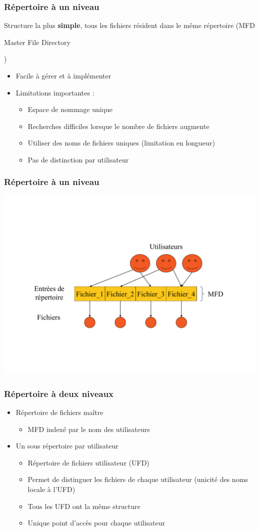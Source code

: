 \begin{frame}
\frametitle{Répertoire à un niveau}
Structure la plus \textbf{simple}, tous les fichiers résident dans le même répertoire (MFD \begin{tiny}Master File Directory\end{tiny})
\begin{itemize}
\item Facile à gérer et à implémenter
\item Limitations importantes :
\begin{itemize}
\item Espace de nommage unique
\item Recherches difficiles lorsque le nombre de fichiers augmente
\item Utiliser des noms de fichiers uniques (limitation en longueur)
\item Pas de distinction par utilisateur
\end{itemize}
\end{itemize}
\end{frame}

\begin{frame}
\frametitle{Répertoire à un niveau}
\includegraphics[width=.9\textwidth]{../illustration/repertoire_1niveau.pdf}
\end{frame}

\begin{frame}
\frametitle{Répertoire à deux niveaux}
\begin{itemize}
\item Répertoire de fichiers maître
\begin{itemize}
\item MFD indexé par le nom des utilisateurs
\end{itemize}
\item Un sous répertoire par utilisateur
\begin{itemize}
\item Répertoire de fichiers utilisateur (UFD)
\item Permet de distinguer les fichiers de chaque utilisateur (unicité des noms locale à l'UFD)
\item Tous les UFD ont la même structure
\item Unique point d'accès pour chaque utilisateur
\end{itemize}
\end{itemize}
\end{frame}

